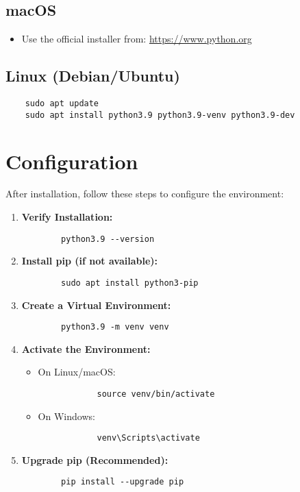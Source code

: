 \subsection*{macOS}

\begin{itemize}
	\item Use the official installer from: \url{https://www.python.org}
\end{itemize}

\subsection*{Linux (Debian/Ubuntu)}

\begin{verbatim}
	sudo apt update
	sudo apt install python3.9 python3.9-venv python3.9-dev
\end{verbatim}

\section{Configuration}

After installation, follow these steps to configure the environment:

\begin{enumerate}
	\item \textbf{Verify Installation:}
	\begin{verbatim}
		python3.9 --version
	\end{verbatim}
	
	\item \textbf{Install pip (if not available):}
	\begin{verbatim}
		sudo apt install python3-pip
	\end{verbatim}
	
	\item \textbf{Create a Virtual Environment:}
	\begin{verbatim}
		python3.9 -m venv venv
	\end{verbatim}
	
	\item \textbf{Activate the Environment:}
	\begin{itemize}
		\item On Linux/macOS:
		\begin{verbatim}
			source venv/bin/activate
		\end{verbatim}
		\item On Windows:
		\begin{verbatim}
			venv\Scripts\activate
		\end{verbatim}
	\end{itemize}
	
	\item \textbf{Upgrade pip (Recommended):}
	\begin{verbatim}
		pip install --upgrade pip
	\end{verbatim}
\end{enumerate}

